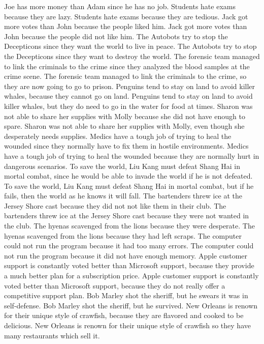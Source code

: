 \documentclass{article}
\begin{document}
\begin{enumerate}
	Joe has more money than Adam since he has no job.
	Students hate exams because they are lazy.
	Students hate exams because they are tedious.
	Jack got more votes than John because the people liked him.
	Jack got more votes than John because the people did not like him.
	The Autobots try to stop the Decepticons since they want the world to live in peace.
	The Autobots try to stop the Decepticons since they want to destroy the world.
	The forensic team managed to link the criminals to the crime since they analyzed the blood samples at the crime scene.
	The forensic team managed to link the criminals to the crime, so they are now going to go to prison.
	Penguins tend to stay on land to avoid killer whales, because they cannot go on land.
	Penguins tend to stay on land to avoid killer whales, but they do need to go in the water for food at times.
	Sharon was not able to share her supplies with Molly because she did not have enough to spare.
	Sharon was not able to share her supplies with Molly, even though she desperately needs supplies.
	Medics have a tough job of trying to heal the wounded since they normally have to fix them in hostile environments.
	Medics have a tough job of trying to heal the wounded because they are normally hurt in dangerous scenarios.
	To save the world, Liu Kang must defeat Shang Hai in mortal combat, since he would be able to invade the world if he is not defeated.
	To save the world, Liu Kang must defeat Shang Hai in mortal combat, but if he fails, then the world as he knows it will fall.
	The bartenders threw ice at the Jersey Shore cast because they did not not like them in their club.
	The bartenders threw ice at the Jersey Shore cast because they were not wanted in the club.
	The hyenas scavenged from the lions because they were desperate.
	The hyenas scavenged from the lions because they had left scraps.
	The computer could not run the program because it had too many errors.
	The computer could not run the program because it did not have enough memory.
	Apple customer support is constantly voted better than Microsoft support, because they provide a much better plan for a subscription price.
	Apple customer support is constantly voted better than Microsoft support, because they do not really offer a competitive support plan.
	Bob Marley shot the sheriff, but he swears it was in self-defense.
	Bob Marley shot the sheriff, but he survived.
	New Orleans is renown for their unique style of crawfish, because they are flavored and cooked to be delicious.
	New Orleans is renown for their unique style of crawfish so they have many restaurants which sell it.

\end{enumerate}
\end{document}
